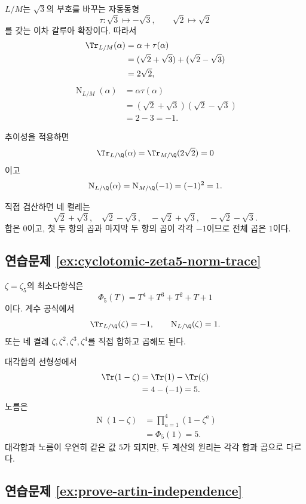 \begin{solution}
$L/M$는 $\sqrt3$의 부호를 바꾸는 자동동형
\[
  \tau:\sqrt3\mapsto-\sqrt3,
  \qquad \sqrt2\mapsto\sqrt2
\]
를 갖는 이차 갈루아 확장이다. 따라서
\[
\begin{aligned}
  \Tr_{L/M}(\alpha)
  &=\alpha+\tau(\alpha)\\
  &=(\sqrt2+\sqrt3)+(\sqrt2-\sqrt3)\\
  &=2\sqrt2,
\end{aligned}
\]
\[
\begin{aligned}
  \operatorname N_{L/M}(\alpha)
  &=\alpha\tau(\alpha)\\
  &=(\sqrt2+\sqrt3)(\sqrt2-\sqrt3)\\
  &=2-3=-1.
\end{aligned}
\]

추이성을 적용하면
\[
  \Tr_{L/\Q}(\alpha)
  =\Tr_{M/\Q}(2\sqrt2)=0
\]
이고
\[
  \operatorname N_{L/\Q}(\alpha)
  =\operatorname N_{M/\Q}(-1)=(-1)^2=1.
\]

직접 검산하면 네 켤레는
\[
  \sqrt2+\sqrt3,
  \quad\sqrt2-\sqrt3,
  \quad-\sqrt2+\sqrt3,
  \quad-\sqrt2-\sqrt3.
\]
합은 $0$이고, 첫 두 항의 곱과 마지막 두 항의 곱이 각각 $-1$이므로 전체 곱은 $1$이다.
\end{solution}

\subsection*{연습문제 \ref{ex:cyclotomic-zeta5-norm-trace}}

\begin{solution}
$\zeta=\zeta_5$의 최소다항식은
\[
  \Phi_5(T)=T^4+T^3+T^2+T+1
\]
이다. 계수 공식에서
\[
  \Tr_{L/\Q}(\zeta)=-1,
  \qquad
  \operatorname N_{L/\Q}(\zeta)=1.
\]
또는 네 켤레 $\zeta,\zeta^2,\zeta^3,\zeta^4$를 직접 합하고 곱해도 된다.

대각합의 선형성에서
\[
\begin{aligned}
  \Tr(1-\zeta)
  &=\Tr(1)-\Tr(\zeta)\\
  &=4-(-1)=5.
\end{aligned}
\]
노름은
\[
\begin{aligned}
  \operatorname N(1-\zeta)
  &=\prod_{a=1}^4(1-\zeta^a)\\
  &=\Phi_5(1)=5.
\end{aligned}
\]
대각합과 노름이 우연히 같은 값 $5$가 되지만, 두 계산의 원리는 각각 합과 곱으로 다르다.
\end{solution}

\subsection*{연습문제 \ref{ex:prove-artin-independence}}

